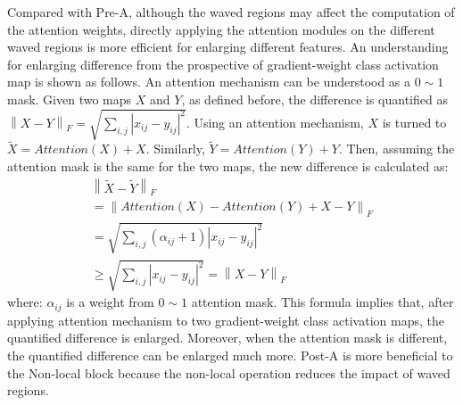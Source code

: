 \documentclass[journal]{IEEEtran}
\begin{document}
Compared with Pre-A, although the waved regions may affect the computation of the attention weights, directly applying the attention modules on the different waved regions is more efficient for enlarging different features.  An understanding for enlarging difference from the prospective of gradient-weight class activation map is shown as follows. An attention mechanism can be understood as a $0 \sim 1$ mask. Given two maps $X$ and $Y$, as defined before, the difference is quantified as  ${\left\| {X - Y} \right\|_F} = \sqrt {\sum\nolimits_{i,j} {{{\left| {{x_{ij}} - {y_{ij}}} \right|}^2}} } $.  Using an attention mechanism, $X$ is turned to ${\widetilde X} = Attention(X)+X$. Similarly, ${\widetilde Y} = Attention(Y)+Y$. Then, assuming the attention mask is the same for the two maps, the new difference is calculated as: 
\begin{equation}
\begin{array}{l}
{\left\| {\tilde X - \tilde Y} \right\|_F}\\
 = {\left\| {Attention\left( X \right) - Attention\left( Y \right) + X - Y} \right\|_F}\\
 = \sqrt {\sum\nolimits_{i,j} {\left( {{\alpha _{ij}} + 1} \right){{\left| {{x_{ij}} - {y_{ij}}} \right|}^2}} } \\
 \ge \sqrt {\sum\nolimits_{i,j} {{{\left| {{x_{ij}} - {y_{ij}}} \right|}^2}} } = {\left\| {X - Y} \right\|_F}
\end{array}
\end{equation}
where: $\alpha _{ij}$ is a weight from $0 \sim 1$ attention mask. This formula implies that, after applying attention mechanism to two gradient-weight class activation maps, the quantified difference is enlarged.  Moreover, when the attention mask is different, the quantified difference can be enlarged much more.
Post-A is more beneficial to the Non-local block because the non-local operation reduces the impact of waved regions. 
\end{document}
